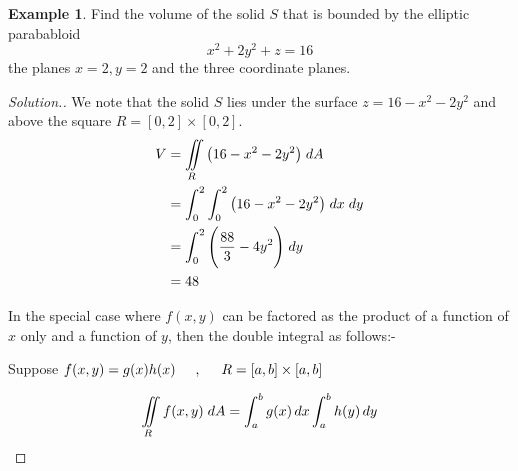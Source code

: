 \documentclass[11pt,a4paper]{article}
\theoremstyle{definition}
\newtheorem{exa}[thm]{Example}
\newenvironment{solution}
  {\renewcommand{\qedsymbol}{}\begin{proof}[\textit{Solution}.]}
  {\end{proof}}
\begin{document}
\begin{exa}


Find the volume of the solid $S$ that is bounded by the elliptic parababloid $$x^2+ 2y^2 + z = 16$$ the planes $x=2, y = 2$ and the three coordinate planes.


\begin{figure}[H]
\centering
{}
\end{figure}
\end{exa}

\begin{solution}


We note that the solid $S$ lies under the surface $z = 16 - x^2 -2y^2$ and above the square $R = [0,2]\times [0,2]$.
\begin{align*}
V & = \iint\limits_R \big( 16 - x^2 - 2y^2\big)\hspace{0.1cm} dA\\
& = \int^2_0\int^2_0 \big(16 - x^2 -2y^2 \big) \hspace{0.1cm}dx\hspace{0.1cm} dy\\
& = \int^2_0\Bigg( \frac{88}{3} - 4y^2\Bigg)\hspace{0.1cm}dy\\
& = 48\\
\end{align*}

In the special case where $f(x,y)$ can be factored as the product of a function of $x$ only and a function of $y$, then the double integral as follows:-


Suppose $f(x,y) = g(x)h(x)\hspace{0.5cm}, \hspace{0.5cm} R = [a,b]\times [a,b]$

$$ \iint\limits_R f(x,y)\hspace{0.1cm}dA = \int^b_ag(x)\,dx\int^b_ah(y)\,dy$$
\end{solution}
\end{document}
